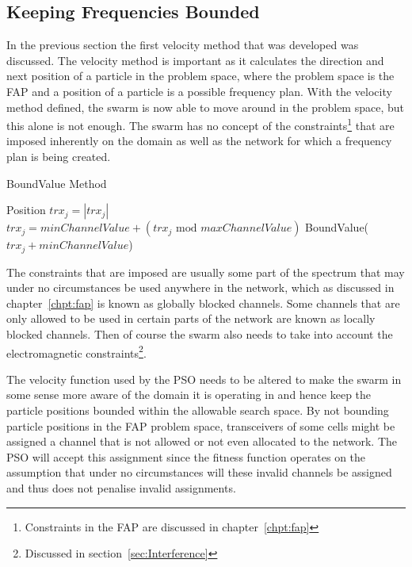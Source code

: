 \subsection{Keeping Frequencies Bounded}
In the previous section the first velocity method that was developed was discussed. The velocity method is important as it calculates the direction and next position of a particle in the problem space, where the problem space is the FAP and a position of a particle is a possible frequency plan. With the velocity method defined, the swarm is now able to move around in the problem space, but this alone is not enough. The swarm has no concept of the constraints\footnote{Constraints in the FAP are discussed in chapter~\ref{chpt:fap}} that are imposed inherently on the domain as well as the network for which a frequency plan is being created.
\begin{algorithm}
\caption{BoundValue Method}
\label{alg:boundvalue}
\begin{algorithmic}[1]
	\Require Position
			\State $trx_j = \left|trx_j\right|$
				\State $trx_j = minChannelValue + (\text{$trx_j$ mod $maxChannelValue$})$
			\Else 
					\State BoundValue($trx_j + minChannelValue$)
				\EndIf
			\EndIf
		\EndFor
	\EndFor
\end{algorithmic}
\end{algorithm}
The constraints that are imposed are usually some part of the spectrum that may under no circumstances be used anywhere in the network, which as discussed in chapter~\ref{chpt:fap} is known as globally blocked channels. Some channels that are only allowed to be used in certain parts of the network are known as locally blocked channels. Then of course the swarm also needs to take into account the electromagnetic constraints\footnote{Discussed in section~\ref{sec:Interference}}.

The velocity function used by the PSO needs to be altered to make the swarm in some sense more aware of the domain it is operating in and hence keep the particle positions bounded within the allowable search space. By not bounding particle positions in the FAP problem space, transceivers of some cells might be assigned a channel that is not allowed or not even allocated to the network. The PSO will accept this assignment since the fitness function operates on the assumption that under no circumstances will these invalid channels be assigned and thus does not penalise invalid assignments.

